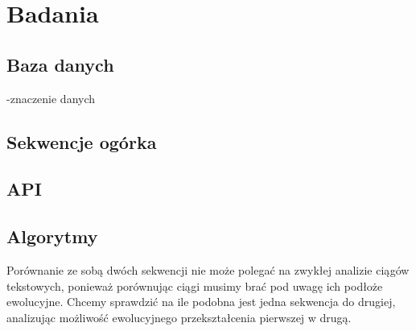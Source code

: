 \chapter{Badania}

\section{Baza danych}
-znaczenie danych

\section{Sekwencje ogórka}

\section{API}

\section{Algorytmy}
Porównanie ze sobą dwóch sekwencji nie może polegać na zwykłej analizie ciągów tekstowych, ponieważ porównując ciągi musimy brać pod uwagę ich podłoże ewolucyjne. Chcemy sprawdzić na ile podobna jest jedna sekwencja do drugiej, analizując możliwość ewolucyjnego przekształcenia pierwszej w drugą. 